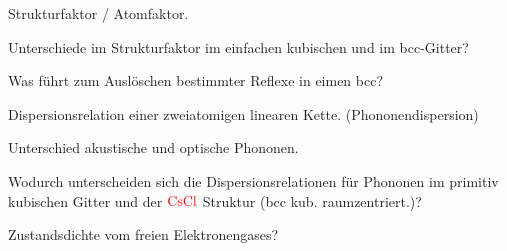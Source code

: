 \documentclass[a5paper,12pt,ngerman,print,grid=front]{kartei}
\let\oldce\ce
\renewcommand*{\ce}[1]{\begingroup\color{red}\oldce{#1}\endgroup}
\begin{document}
	\begin{karte}{
		Strukturfaktor / Atomfaktor.
		}
		
		
		
	\end{karte}


	\begin{karte}{
		Unterschiede im Strukturfaktor im einfachen kubischen und im bcc-Gitter?
		}
		
		
		
	\end{karte}


	\begin{karte}{
		Was führt zum Auslöschen bestimmter Reflexe in eimen bcc?
		}
		
		
		
	\end{karte}


	\begin{karte}{
		Dispersionsrelation einer zweiatomigen linearen Kette. (Phononendispersion)
		}
		
		
		
	\end{karte}


	\begin{karte}{
		Unterschied akustische und optische Phononen.
		}
		
		
		
	\end{karte}


	\begin{karte}{
		Wodurch unterscheiden sich die Dispersionsrelationen für Phononen im primitiv 
		kubischen Gitter und der $\ce{CsCl}$ Struktur (bcc kub. raumzentriert.)?
		}
		
		
		
	\end{karte}


	\begin{karte}{
		Zustandsdichte vom freien Elektronengases?
		}
		
		
		
	\end{karte}
\end{document}
